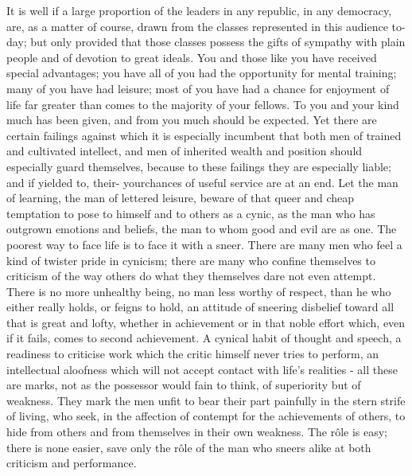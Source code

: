 \documentclass{scrbook}
\begin{document}
It is well if a large proportion of the leaders in any republic, in any democracy, are, as
a matter of course, drawn from the classes represented in this audience to-day; but only
provided that those classes possess the gifts of sympathy with plain people and of devotion
to great ideals. You and those like you have received special advantages; you have all of you
had the opportunity for mental training; many of you have had leisure; most of you have
had a chance for enjoyment of life far greater than comes to the majority of your fellows.
To you and your kind much has been given, and from you much should be expected. Yet
there are certain failings against which it is especially incumbent that both men of trained
and cultivated intellect, and men of inherited wealth and position should especially guard
themselves, because to these failings they are especially liable; and if yielded to, their- yourchances of useful service are at an end. Let the man of learning, the man of lettered leisure,
beware of that queer and cheap temptation to pose to himself and to others as a cynic, as
the man who has outgrown emotions and beliefs, the man to whom good and evil are as
one. The poorest way to face life is to face it with a sneer. There are many men who feel
a kind of twister pride in cynicism; there are many who confine themselves to criticism of
the way others do what they themselves dare not even attempt. There is no more unhealthy
being, no man less worthy of respect, than he who either really holds, or feigns to hold, an
attitude of sneering disbelief toward all that is great and lofty, whether in achievement or
in that noble effort which, even if it fails, comes to second achievement. A cynical habit
of thought and speech, a readiness to criticise work which the critic himself never tries to
perform, an intellectual aloofness which will not accept contact with life’s realities - all
these are marks, not as the possessor would fain to think, of superiority but of weakness.
They mark the men unfit to bear their part painfully in the stern strife of living, who seek,
in the affection of contempt for the achievements of others, to hide from others and from
themselves in their own weakness. The rôle is easy; there is none easier, save only the rôle
of the man who sneers alike at both criticism and performance.
\end{document}
